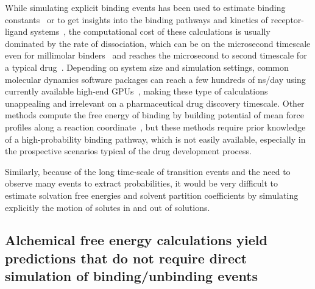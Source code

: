 \documentclass[9pt,bestpractices,pubversion]{livecoms}
\begin{document}
While simulating explicit binding events has been used to estimate binding constants~\cite{jong2011determining,pan2017quantitative} or to get insights into the binding pathways and kinetics of receptor-ligand systems~\cite{teo2016adaptive,votapka2017seekr,doerr2014onthefly,plattner2015protein,dixon2018predicting}, the computational cost of these calculations is usually dominated by the rate of dissociation, which can be on the microsecond timescale even for millimolar binders~\cite{pan2017quantitative} and reaches the microsecond to second timescale for a typical drug~\cite{basavapathruni2012conformational,hyre2006cooperative}.
Depending on system size and simulation settings, common molecular dynamics software packages can reach a few hundreds of ns/day using currently available high-end GPUs~\cite{eastman2017openmm,kutzner2019more}, making these type of calculations unappealing and irrelevant on a pharmaceutical drug discovery timescale.
Other methods compute the free energy of binding by building potential of mean force profiles along a reaction coordinate~\cite{woo2005calculation,velez-vega2013overcoming,limongelli2013funnel,heinzelmann2017attachpullrelease}, but these methods require prior knowledge of a high-probability binding pathway, which is not easily available, especially in the prospective scenarios typical of the drug development process.

Similarly, because of the long time-scale of transition events and the need to observe many events to extract probabilities, it would be very difficult to estimate solvation free energies and solvent partition coefficients by simulating explicitly the motion of solutes in and out of solutions.

\subsection{Alchemical free energy calculations yield predictions that do not require direct simulation of binding/unbinding events}
\end{document}

